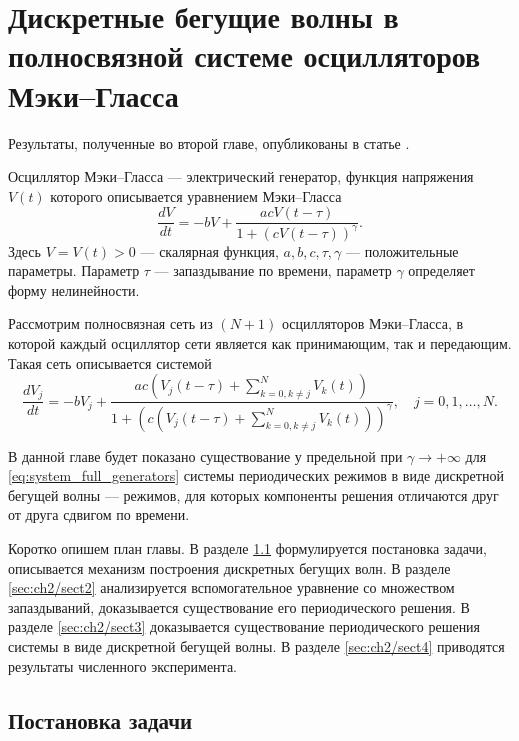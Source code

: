 \chapter{Дискретные бегущие волны в полносвязной системе осцилляторов Мэки--Гласса}\label{ch:ch2}

Результаты, полученные во второй главе, опубликованы в статье \cite{wosbib2}.

Осциллятор Мэки--Гласса --- электрический генератор, функция напряжения $V(t)$ которого описывается уравнением Мэки--Гласса
%
\begin{equation}
	\dfrac{d V}{dt}=
	- bV+\dfrac{acV(t - \tau) }{1 + (cV(t - \tau))^{\gamma}}.
\end{equation}
%
Здесь $V = V(t) > 0$ --- скалярная функция, $a, b, c, \tau, \gamma$ --- положительные параметры. Параметр $\tau$ --- запаздывание по времени, параметр $\gamma$ определяет форму нелинейности.

Рассмотрим полносвязная сеть из $(N + 1)$ осцилляторов Мэки--Гласса, в которой каждый осциллятор сети является как принимающим, так и передающим. Такая сеть описывается системой
\small
\begin{equation}
	\label{eq:system_full_generators}
	\dfrac{d V_{j}}{dt}=- bV_{j} + \dfrac{ac\left(V_{j}(t - \tau) + \sum\limits_{k = 0, k\neq j}^{N}V_{k}(t)\right)}{1 + \left(c\left(V_{j}(t - \tau) + \sum\limits_{k = 0, k\neq j}^{N}V_{k}(t)\right)\right)^{\gamma}}, \quad j=0,1,\ldots,N.
\end{equation}
\normalsize

В данной главе будет показано существование у предельной при $\gamma \to +\infty$ для \eqref{eq:system_full_generators} системы периодических режимов в виде дискретной бегущей волны --- режимов, для которых компоненты решения отличаются друг от друга сдвигом по времени.

Коротко опишем план главы. В разделе \ref{sec:ch2/sect1} формулируется постановка задачи, описывается механизм построения дискретных бегущих волн. В разделе \ref{sec:ch2/sect2} анализируется вспомогательное уравнение со множеством запаздываний, доказывается существование его периодического решения. В разделе \ref{sec:ch2/sect3} доказывается существование периодического решения системы в виде дискретной бегущей волны. В разделе \ref{sec:ch2/sect4} приводятся результаты численного эксперимента.

\section{Постановка задачи}\label{sec:ch2/sect1}

